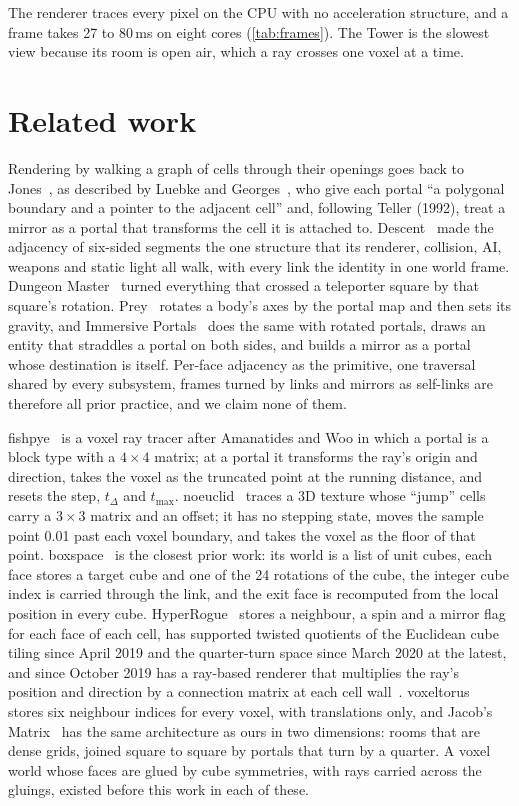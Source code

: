 \documentclass[10pt,a4paper]{article}
\newcommand{\tmax}{t_{\max}}
\newcommand{\tdelta}{t_{\Delta}}
\begin{document}
The renderer traces every pixel on the CPU with no acceleration structure, and a frame takes
27 to 80\,ms on eight cores (\cref{tab:frames}). The Tower is the slowest view because its room
is open air, which a ray crosses one voxel at a time.

\section{Related work}
\label{sec:related}

Rendering by walking a graph of cells through their openings goes back to Jones~\cite{jones1971}, as
described by Luebke and Georges~\cite{luebke1995}, who give each portal ``a polygonal boundary and
a pointer to the adjacent cell'' and, following Teller (1992), treat a mirror as a portal that
transforms the cell it is attached to. Descent~\cite{descent} made the adjacency of six-sided
segments the one structure that its renderer, collision, AI, weapons and static light all walk,
with every link the identity in one world frame. Dungeon Master~\cite{dungeonmaster} turned
everything that crossed a teleporter square by that square's rotation. Prey~\cite{prey} rotates a
body's axes by the portal map and then sets its gravity, and Immersive
Portals~\cite{immersiveportals} does the same with rotated portals, draws an entity that
straddles a portal on both sides, and builds a mirror as a portal whose destination is itself.
Per-face adjacency as the primitive, one traversal shared by every subsystem, frames turned by
links and mirrors as self-links are therefore all prior practice, and we claim none of them.

fishpye~\cite{fishpye} is a voxel ray tracer after Amanatides and Woo in which a portal is a
block type with a $4\times4$ matrix; at a portal it transforms the ray's origin and direction,
takes the voxel as the truncated point at the running distance, and resets the step, $\tdelta$
and $\tmax$. noeuclid~\cite{noeuclid} traces a 3D texture whose ``jump'' cells carry a
$3\times3$ matrix and an offset; it has no stepping state, moves the sample point 0.01 past each
voxel boundary, and takes the voxel as the floor of that point. boxspace~\cite{boxspace} is the
closest prior work: its world is a list of unit cubes, each face stores a target cube and one of
the 24 rotations of the cube, the integer cube index is carried through the link, and the exit
face is recomputed from the local position in every cube.
HyperRogue~\cite{hyperrogue2017} stores a neighbour, a spin and a mirror flag for each face of
each cell, has supported twisted quotients of the Euclidean cube tiling since April 2019 and the
quarter-turn space since March 2020 at the latest, and since October 2019 has a ray-based
renderer that multiplies the ray's position and direction by a connection matrix at each cell
wall~\cite{kopczynski2022,celinska2022}. voxeltorus~\cite{voxeltorus} stores six neighbour
indices for every voxel, with translations only, and Jacob's Matrix~\cite{jacobsmatrix} has the
same architecture as ours in two dimensions: rooms that are dense grids, joined square to square
by portals that turn by a quarter. A voxel world whose faces are glued by cube symmetries, with
rays carried across the gluings, existed before this work in each of these.
\end{document}
